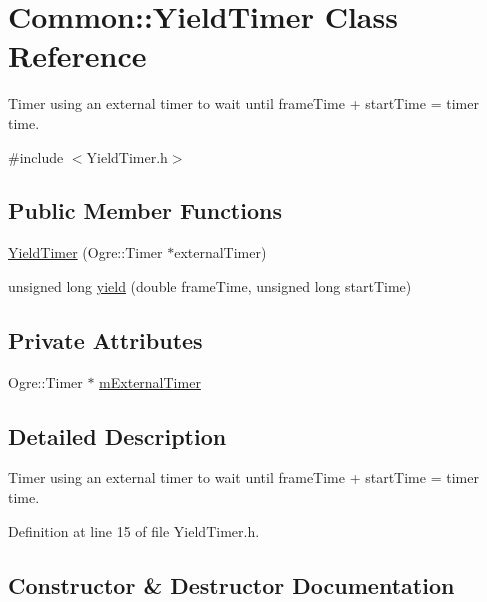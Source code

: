 \hypertarget{class_common_1_1_yield_timer}{}\section{Common\+:\+:Yield\+Timer Class Reference}
\label{class_common_1_1_yield_timer}


Timer using an external timer to wait until frame\+Time + start\+Time = timer time.  




{\ttfamily \#include $<$Yield\+Timer.\+h$>$}

\subsection*{Public Member Functions}
\begin{DoxyCompactItemize}
\item 
\hyperlink{class_common_1_1_yield_timer_a4d1c12e6e3f5e825d796286f0c1e2345}{Yield\+Timer} (Ogre\+::\+Timer $\ast$external\+Timer)
\item 
unsigned long \hyperlink{class_common_1_1_yield_timer_a55ba2e4b796cc59768c5200cc38d303c}{yield} (double frame\+Time, unsigned long start\+Time)
\end{DoxyCompactItemize}
\subsection*{Private Attributes}
\begin{DoxyCompactItemize}
\item 
Ogre\+::\+Timer $\ast$ \hyperlink{class_common_1_1_yield_timer_a4c2a436d618e91f6634ec932cf4e1a9c}{m\+External\+Timer}
\end{DoxyCompactItemize}


\subsection{Detailed Description}
Timer using an external timer to wait until frame\+Time + start\+Time = timer time. 

Definition at line 15 of file Yield\+Timer.\+h.



\subsection{Constructor \& Destructor Documentation}
\mbox{\label{class_common_1_1_yield_timer_a4d1c12e6e3f5e825d796286f0c1e2345}} 
